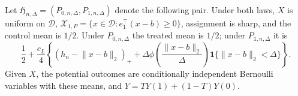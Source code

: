 Let \(\mathfrak H_{n,\Delta}=(P_{0,n,\Delta},P_{1,n,\Delta})\) denote the following pair.  Under both laws, \(X\) is uniform on \(\mathcal D\), \(\mathcal X_{1,P}=\{x\in\mathcal D:e_1^{\top}(x-b)\geq0\}\), assignment is sharp, and the control mean is \(1/2\).  Under \(P_{0,n,\Delta}\) the treated mean is \(1/2\); under \(P_{1,n,\Delta}\) it is
\[
 \frac12+\frac{c_L}{4}\left\{(h_n-\lVert x-b\rVert_2)_+
 +\Delta\phi\!\left(\frac{\lVert x-b\rVert_2}{\Delta}\right)
 \mathbf1\{\lVert x-b\rVert_2<\Delta\}\right\}.
\]
Given \(X\), the potential outcomes are conditionally independent Bernoulli variables with these means, and \(Y=TY(1)+(1-T)Y(0)\).